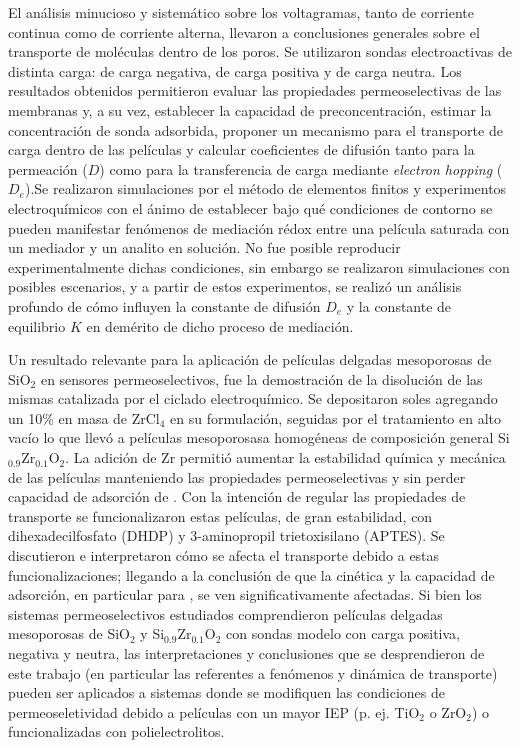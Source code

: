  El análisis minucioso y sistemático sobre los voltagramas, tanto de corriente continua como de corriente alterna, llevaron a conclusiones generales sobre el transporte de moléculas dentro de los poros. Se utilizaron sondas electroactivas de distinta carga: \ferroferri\space de carga negativa, \aminorutenio\space de carga positiva y \ferroceno\space de carga neutra. Los resultados obtenidos permitieron evaluar las propiedades permeoselectivas de las membranas y, a su vez, establecer la capacidad de preconcentración, estimar la concentración de sonda adsorbida, proponer un mecanismo para el transporte de carga dentro de las películas y calcular coeficientes de difusión tanto para la permeación ($D$) como para la transferencia de carga mediante \textit{electron hopping} ($D_e$).Se realizaron simulaciones por el método de elementos finitos y experimentos electroquímicos con el ánimo de establecer bajo qué condiciones de contorno se pueden manifestar fenómenos de mediación rédox entre una película saturada con un mediador y un analito en solución. No fue posible reproducir experimentalmente dichas condiciones, sin embargo se realizaron simulaciones con posibles escenarios, y a partir de estos experimentos, se realizó un análisis profundo de cómo influyen la constante de difusión $D_e$ y la constante de equilibrio $K$ en demérito de dicho proceso de mediación. 

 Un resultado relevante para la aplicación de películas delgadas mesoporosas de SiO$_2$ en sensores permeoselectivos, fue la demostración de la disolución de las mismas  catalizada por el ciclado electroquímico. Se depositaron soles agregando un 10\% en masa de ZrCl$_4$ en su formulación, seguidas por el tratamiento en alto vacío lo que llevó a películas mesoporosasa homogéneas de composición general Si$_{0.9}$Zr$_{0.1}$O$_2$. La adición de Zr permitió aumentar la estabilidad química y mecánica de las películas manteniendo las propiedades permeoselectivas y sin perder capacidad de adsorción de \aminorutenio. Con la intención de regular las propiedades de transporte se funcionalizaron estas películas, de gran estabilidad, con dihexadecilfosfato (DHDP) y 3-aminopropil trietoxisilano (APTES). Se discutieron e interpretaron cómo se afecta el transporte debido a estas funcionalizaciones; llegando a la conclusión de que la cinética y la capacidad de adsorción, en particular para \ru, se ven significativamente afectadas. Si bien los sistemas permeoselectivos estudiados comprendieron películas delgadas mesoporosas de SiO$_2$ y Si$_{0.9}$Zr$_{0.1}$O$_2$ con sondas modelo con carga positiva, negativa y neutra, las interpretaciones y conclusiones que se desprendieron de este trabajo (en particular las referentes a  fenómenos y dinámica de transporte) pueden ser aplicados a sistemas donde se modifiquen las condiciones de permeoseletividad debido a películas con un mayor IEP (p. ej. TiO$_2$ o ZrO$_2$) o funcionalizadas con polielectrolitos. 
 
